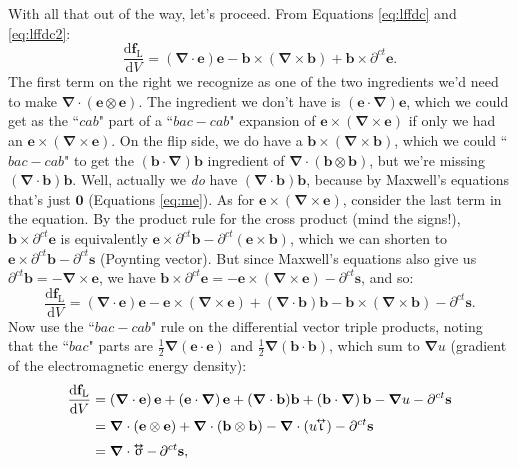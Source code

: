 \documentclass[12pt]{article}
\renewcommand{\vv}[1]{\mathbf{#1}}
\newcommand{\dd}[1]{\mathrm{d}#1}
\newcommand{\del}{\boldsymbol{\nabla}}
\newcommand{\tightoverset}[2]{%
  \mathop{#2}\limits^{\vbox to -.5ex{\kern-0.75ex\hbox{$#1$}\vss}}}
\newcommand{\inlinedy}[1]{\tightoverset{\text{\tiny$\bm\leftrightarrow$}}{#1}}
\begin{document}
With all that out of the way, let's proceed. From Equations \ref{eq:lffdc} and \ref{eq:lffdc2}:
\begin{equation*}
\dfrac{\dd \vv f_{\mathrm{L}}}{\dd V} = \left( \del \cdot \vv e \right) \vv e - \vv b \times \left( \del \times \vv b \right) + \vv b \times \partial^{ct} \vv e .
\end{equation*}
The first term on the right we recognize as one of the two ingredients we'd need to make $\del \cdot (\vv e \otimes \vv e)$. The ingredient we don't have is $(\vv e \cdot \del) \vv e$, which we could get as the ``$cab$" part of a ``$bac - cab$" expansion of $\vv e \times (\del \times \vv e)$ if only we had an $\vv e \times (\del \times \vv e)$. On the flip side, we do have a $\vv b \times (\del \times \vv b)$, which we could ``$bac - cab$" to get the $(\vv b \cdot \del) \vv b$ ingredient of $\del \cdot (\vv b \otimes \vv b)$, but we're missing $(\del \cdot \vv b) \vv b$. Well, actually we \emph{do} have $(\del \cdot \vv b) \vv b$, because by Maxwell's equations that's just $\vv 0$ (Equations \ref{eq:me}). As for $\vv e \times (\del \times \vv e)$, consider the last term in the equation. By the product rule for the cross product (mind the signs!), $\vv b \times \partial^{ct} \vv e$ is equivalently $\vv e \times \partial^{ct} \vv b - \partial^{ct} \left( \vv e \times \vv b \right)$, which we can shorten to $\vv e \times \partial^{ct} \vv b - \partial^{ct} \vv s$ (Poynting vector). But since Maxwell's equations also give us $\partial^{ct} \vv b = - \del \times \vv e$, we have $\vv b \times \partial^{ct} \vv e = - \vv e \times (\del \times \vv e) - \partial^{ct} \vv s$, and so:
\begin{equation*}
\dfrac{\dd \vv f_{\mathrm{L}}}{\dd V} = \left( \del \cdot \vv e \right) \vv e - \vv e \times (\del \times \vv e) + (\del \cdot \vv b) \vv b - \vv b \times \left( \del \times \vv b \right) - \partial^{ct} \vv s .
\end{equation*}
Now use the ``$bac - cab$" rule on the differential vector triple products, noting that the ``$bac$" parts are $\frac{1}{2} \del (\vv e \cdot \vv e)$ and $\frac{1}{2} \del (\vv b \cdot \vv b)$, which sum to $\del u$ (gradient of the electromagnetic energy density):
\begin{equation*}
\begin{aligned}
\dfrac{\dd \vv f_{\mathrm{L}}}{\dd V} &= \left( \del \cdot \vv e \right) \vv e + \left( \vv e \cdot \del \right) \vv e + (\del \cdot \vv b) \vv b + \left( \vv b \cdot \del \right) \vv b - \del u - \partial^{ct} \vv s \\
&= \del \cdot (\vv e \otimes \vv e) + \del \cdot (\vv b \otimes \vv b) - \del \cdot (u \mkern-4.5mu \inlinedy{\upiota}) - \partial^{ct} \vv s \\[2pt]
&= \del \cdot \inlinedy{\upsigma} - \, \partial^{ct} \vv s ,
\end{aligned}
\end{equation*}
\end{document}
